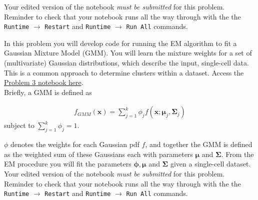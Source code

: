 \documentclass[11pt]{exam}
\begin{document}
\begin{questions}
Your edited version of the notebook \textit{must be submitted } for this problem. Reminder to check that your notebook runs all the way through with the the {\tt Runtime} $\xrightarrow{}$ {\tt Restart} and {\tt Runtime} $\xrightarrow{}$ {\tt Run All} commands.

\newpage

\question[30] In this problem you will develop code for running the EM algorithm to fit a Gaussian Mixture Model (GMM). You will learn the mixture weights for a set of (multivariate) Gaussian distributions, which describe the input, single-cell data. This is a common approach to determine clusters within a dataset. Access the \href{https://github.com/pachterlab/BI-BE-CS-183-2023/blob/main/HW4/Problem3.ipynb}{Problem 3 notebook here}.\\

Briefly, a GMM is defined as

\begin{align}
f_{GMM}(\mathbf{x})=\sum_{j=1}^k \phi_j f(\mathbf {x};{\boldsymbol{\mu }}_{j},\mathbf{\Sigma}_{j})
\end{align}
subject to $\sum_{j=1}^k \phi_j = 1$.

$\phi$ denotes the weights for each Gaussian pdf $f$, and together the GMM is defined as the weighted sum of these Gaussians each with parameters $\boldsymbol{\mu}$ and  $\mathbf{\Sigma}$. From the EM procedure you will fit the parameters $\boldsymbol{\phi}, \boldsymbol{\mu} $ and $\mathbf{\Sigma}$ given a single-cell dataset. \\

Your edited version of the notebook \textit{must be submitted } for this problem. Reminder to check that your notebook runs all the way through with the the {\tt Runtime} $\xrightarrow{}$ {\tt Restart} and {\tt Runtime} $\xrightarrow{}$ {\tt Run All} commands.






\end{questions}


\printbibliography
\end{document}
